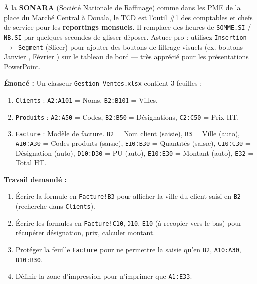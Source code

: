 \documentclass[11pt]{article}
\begin{document}
\begin{savaistu}
À la \textbf{SONARA} (Société Nationale de Raffinage) comme dans les PME de la place du Marché Central à Douala, le TCD est l'outil \#1 des comptables et chefs de service pour les \textbf{reportings mensuels}. Il remplace des heures de \texttt{SOMME.SI} / \texttt{NB.SI} par quelques secondes de glisser-déposer. Astuce pro : utilisez \texttt{Insertion $\rightarrow$ Segment} (Slicer) pour ajouter des boutons de filtrage visuels (ex. boutons \og Janvier \fg, \og Février \fg) sur le tableau de bord — très apprécié pour les présentations PowerPoint.
\end{savaistu}

\begin{exoresolu}
\textbf{Énoncé :} Un classeur \texttt{Gestion\_Ventes.xlsx} contient 3 feuilles :
\begin{enumerate}
    \item \texttt{Clients} : \texttt{A2:A101} = Noms, \texttt{B2:B101} = Villes.
    \item \texttt{Produits} : \texttt{A2:A50} = Codes, \texttt{B2:B50} = Désignations, \texttt{C2:C50} = Prix HT.
    \item \texttt{Facture} : Modèle de facture. \texttt{B2} = Nom client (saisie), \texttt{B3} = Ville (auto), \texttt{A10:A30} = Codes produits (saisie), \texttt{B10:B30} = Quantités (saisie), \texttt{C10:C30} = Désignation (auto), \texttt{D10:D30} = PU (auto), \texttt{E10:E30} = Montant (auto), \texttt{E32} = Total HT.
\end{enumerate}
\textbf{Travail demandé :}
\begin{enumerate}
    \item Écrire la formule en \texttt{Facture!B3} pour afficher la ville du client saisi en \texttt{B2} (recherche dans \texttt{Clients}).
    \item Écrire les formules en \texttt{Facture!C10}, \texttt{D10}, \texttt{E10} (à recopier vers le bas) pour récupérer désignation, prix, calculer montant.
    \item Protéger la feuille \texttt{Facture} pour ne permettre la saisie qu'en \texttt{B2}, \texttt{A10:A30}, \texttt{B10:B30}.
    \item Définir la zone d'impression pour n'imprimer que \texttt{A1:E33}.
\end{enumerate}


\end{exoresolu}
\end{document}
